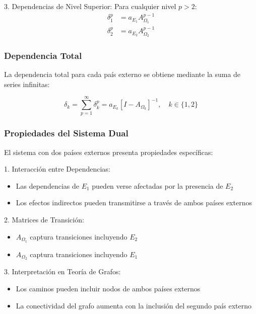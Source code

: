\documentclass[5p,authoryear]{elsarticle}
\begin{document}
3. Dependencias de Nivel Superior:
Para cualquier nivel $p > 2$:
\begin{align}
    \delta_1^p &= a_{E_1}A_{\Omega_1}^{p-1} \\
    \delta_2^p &= a_{E_2}A_{\Omega_2}^{p-1}
\end{align}

\subsubsection{Dependencia Total}

La dependencia total para cada país externo se obtiene mediante la suma de series infinitas:

\begin{equation}
    \delta_k = \sum_{p=1}^{\infty} \delta_k^p = a_{E_k}[I - A_{\Omega_k}]^{-1}, \quad k \in \{1,2\}
\end{equation}

\subsubsection{Propiedades del Sistema Dual}

El sistema con dos países externos presenta propiedades específicas:

1. Interacción entre Dependencias:
   \begin{itemize}
       \item Las dependencias de $E_1$ pueden verse afectadas por la presencia de $E_2$
       \item Los efectos indirectos pueden transmitirse a través de ambos países externos
   \end{itemize}

2. Matrices de Transición:
   \begin{itemize}
       \item $A_{\Omega_1}$ captura transiciones incluyendo $E_2$
       \item $A_{\Omega_2}$ captura transiciones incluyendo $E_1$
   \end{itemize}

3. Interpretación en Teoría de Grafos:
   \begin{itemize}
       \item Los caminos pueden incluir nodos de ambos países externos
       \item La conectividad del grafo aumenta con la inclusión del segundo país externo
   \end{itemize}
\end{document}

